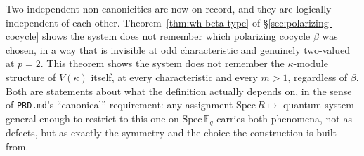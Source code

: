 \begin{remark}[Reading]
Two independent non-canonicities are now on record, and they are logically
independent of each other. Theorem~\ref{thm:wh-beta-type} of
\S\ref{sec:polarizing-cocycle} shows the system does not remember which
polarizing cocycle $\beta$ was chosen, in a way that is invisible at odd
characteristic and genuinely two-valued at $p=2$. This theorem shows the
system does not remember the $\kappa$-module structure of $V(\kappa)$
itself, at every characteristic and every $m>1$, regardless of $\beta$.
Both are statements about what the definition actually depends on, in the
sense of \texttt{PRD.md}'s ``canonical'' requirement: any assignment
$\mathrm{Spec}\,R \mapsto$ quantum system general enough to restrict to this
one on $\mathrm{Spec}\,\mathbb{F}_q$ carries both phenomena, not as defects,
but as exactly the symmetry and the choice the construction is built from.
\end{remark}
